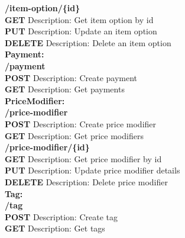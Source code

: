 \documentclass[11pt,a4paper,pdftex]{article}
\begin{document}
\hspace*{1em}\textbf{/item-option/\{id\}}\\
\hspace*{2em}\textbf{GET} Description: Get item option by id\\
\hspace*{2em}\textbf{PUT} Description: Update an item option\\
\hspace*{2em}\textbf{DELETE} Description: Delete an item option\\

\textbf{Payment:}\\
\hspace*{1em}\textbf{/payment}\\
\hspace*{2em}\textbf{POST} Description: Create payment\\
\hspace*{2em}\textbf{GET} Description: Get payments\\



\textbf{PriceModifier:}\\
\hspace*{1em}\textbf{/price-modifier}\\
\hspace*{2em}\textbf{POST} Description: Create price modifier\\
\hspace*{2em}\textbf{GET} Description: Get price modifiers\\

\hspace*{1em}\textbf{/price-modifier/\{\textbf{id}\}}\\
\hspace*{2em}\textbf{GET} Description: Get price modifier by id\\
\hspace*{2em}\textbf{PUT} Description: Update price modifier details\\
\hspace*{2em}\textbf{DELETE} Description: Delete price modifier\\


\textbf{Tag:}\\
\hspace*{1em}\textbf{/tag}\\
\hspace*{2em}\textbf{POST} Description: Create tag\\
\hspace*{2em}\textbf{GET} Description: Get tags\\
\end{document}
